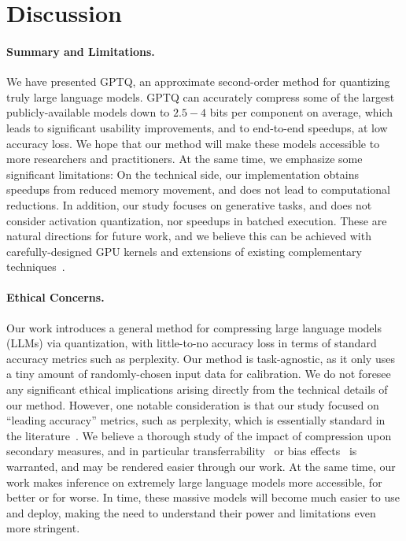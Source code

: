 \section{Discussion}

\paragraph{Summary and Limitations.} We have presented GPTQ, an approximate second-order method for quantizing truly large language models. GPTQ can accurately compress some of the largest publicly-available models down to $2.5 - 4$ bits per component on average, which leads to significant usability improvements, and to end-to-end speedups, at low accuracy loss. We hope that our method will make these models accessible to more researchers and practitioners. At the same time, we emphasize some significant limitations: On the technical side, our implementation obtains speedups from reduced memory movement, and does not lead to computational reductions. In addition, our study focuses on generative tasks, and does not consider activation quantization, nor speedups in batched execution. These are natural directions for future work, and we believe this can be achieved with carefully-designed GPU kernels and extensions of existing complementary techniques~\cite{yao2022zeroquant, wu2022extreme}.

\paragraph{Ethical Concerns.} Our work introduces a general method for compressing large language models (LLMs) via quantization, with little-to-no accuracy loss in terms of standard accuracy metrics such as perplexity. Our method is task-agnostic, as it only uses a tiny amount of randomly-chosen input data for calibration. We do not foresee any significant ethical implications arising directly from the technical details of our method. However, one notable consideration is that our study focused on ``leading accuracy'' metrics, such as perplexity, which is essentially standard in the literature~\cite{dettmers2022llm, yao2022zeroquant}. We believe a thorough study of the impact of compression upon secondary measures, and in particular transferrability~\cite{iofinova2022well} or bias effects~\cite{bender2021dangers} is warranted, and may be rendered easier through our work. At the same time, our work makes inference on extremely large language models more accessible, for better or for worse. In time, these massive models will become much easier to use and deploy, making the need to understand their power and limitations even more stringent. 


